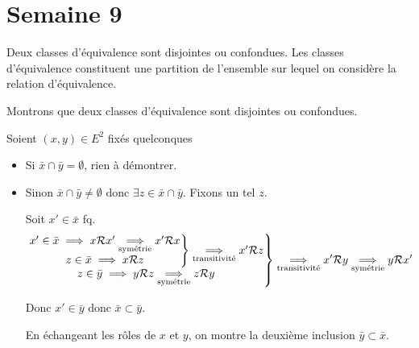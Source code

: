 \documentclass{article}
\renewenvironment{question_kholle}[2][ ]
{
	\subsection{\texorpdfstring{#2}{}}
	\notblank{#1}
	{
		\noindent #1
		\bigbreak
	}
	{}
	\begin{proof}
}
{
	\end{proof}
}
\begin{document}
\pagebreak\section{Semaine 9}

\begin{question_kholle}
  [\noindent Soit \Rel une relation d'équivalence sur $E$. \\
  Soit $x \in E$. \\
  La classe de $x$, notée $\bar{x}$, est l'ensemble des éléments de $E$ en relation avec x.
  $$
  \bar{x} = \left\{ y \in E \;|\; x \Rel y \right\}
  $$
  ]
  {Deux classes d'équivalence sont disjointes ou confondues. Les classes d'équivalence constituent une partition de l'ensemble sur lequel on considère la relation d'équivalence.}
  
  Montrons que deux classes d'équivalence sont disjointes ou confondues.
  
  Soient $(x, y) \in E^2$ fixés quelconques
  \begin{itemize}[label=\textemdash]
    \item Si $\bar{x} \cap \bar{y} = \emptyset$, rien à démontrer.
    \item Sinon $\bar{x} \cap \bar{y} \neq \emptyset$ donc $\exists z \in \bar{x} \cap \bar{y}$. Fixons un tel $z$.
    
    Soit $x' \in \bar{x}$ fq.
    \begin{equation*}
      \left.
      \begin{matrix}
        \left. \begin{matrix}
          x' \in \bar{x} \implies x \mathcal R x' \underset{\text{symétrie}}{\implies} x' \mathcal R x \\
          z \in \bar{x} \implies x \mathcal R z
        \end{matrix}
        \right\} \underset{\text{transitivité}}{\implies} x' \mathcal R z \\
        z \in \bar{y} \implies y \mathcal R z \underset{\text{symétrie}}{\implies} z \mathcal R y
      \end{matrix}
      \right\} \underset{\text{transitivité}}{\implies} x' \mathcal R y
      \underset{\text{symétrie}}{\implies} y \mathcal R x'
    \end{equation*}
    
    Donc $x' \in \bar{y}$ donc $\bar{x} \subset \bar{y}$.
    
    En échangeant les rôles de $x$ et $y$, on montre la deuxième inclusion $\bar{y} \subset \bar{x}$.
  \end{itemize}
  \bigbreak
  

\end{question_kholle}
\end{document}
